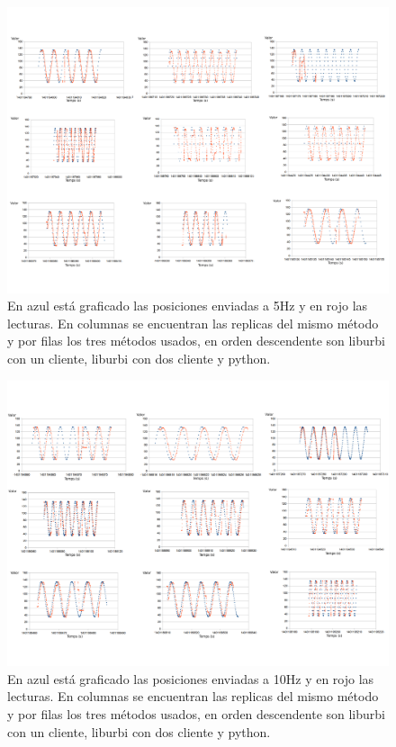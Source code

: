 \documentclass[12pt,a4paper,final,twoside]{article}
\begin{document}
\begin{figure}[H]
	\centering
    \includegraphics[scale=0.37]{images/sin5H.pdf}
	 \caption{En azul está graficado las posiciones enviadas a 5Hz y en rojo las lecturas. En columnas se encuentran las replicas del mismo método y por filas los tres métodos usados, en orden descendente son liburbi con un cliente, liburbi con dos cliente y python.}
  \label{fig:sin5H}
\end{figure}
\begin{figure}[H]
	\centering
    \includegraphics[scale=0.37]{images/sin10H.pdf}
	 \caption{En azul está graficado las posiciones enviadas a 10Hz y en rojo las lecturas. En columnas se encuentran las replicas del mismo método y por filas los tres métodos usados, en orden descendente son liburbi con un cliente, liburbi con dos cliente y python.}
  \label{fig:sin10H}
\end{figure}
\end{document}
